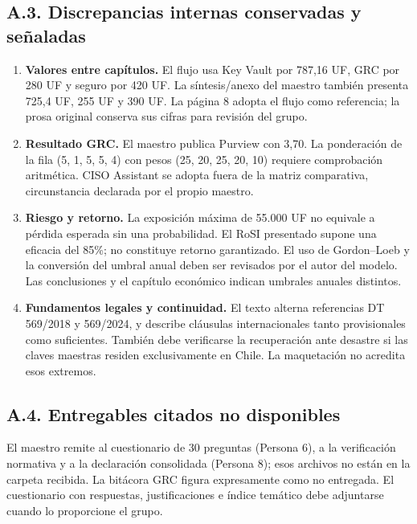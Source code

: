 \subsection{A.3. Discrepancias internas conservadas y señaladas}
\begin{enumerate}[itemsep=4pt]
\item \textbf{Valores entre capítulos.} El flujo usa Key Vault por 787,16 UF, GRC por 280 UF y seguro por 420 UF. La síntesis/anexo del maestro también presenta 725,4 UF, 255 UF y 390 UF. La página 8 adopta el flujo como referencia; la prosa original conserva sus cifras para revisión del grupo.
\item \textbf{Resultado GRC.} El maestro publica Purview con 3,70. La ponderación de la fila (5, 1, 5, 5, 4) con pesos (25, 20, 25, 20, 10) requiere comprobación aritmética. CISO Assistant se adopta fuera de la matriz comparativa, circunstancia declarada por el propio maestro.
\item \textbf{Riesgo y retorno.} La exposición máxima de 55.000 UF no equivale a pérdida esperada sin una probabilidad. El RoSI presentado supone una eficacia del 85\%; no constituye retorno garantizado. El uso de Gordon--Loeb y la conversión del umbral anual deben ser revisados por el autor del modelo. Las conclusiones y el capítulo económico indican umbrales anuales distintos.
\item \textbf{Fundamentos legales y continuidad.} El texto alterna referencias DT 569/2018 y 569/2024, y describe cláusulas internacionales tanto provisionales como suficientes. También debe verificarse la recuperación ante desastre si las claves maestras residen exclusivamente en Chile. La maquetación no acredita esos extremos.
\end{enumerate}

\subsection{A.4. Entregables citados no disponibles}
El maestro remite al cuestionario de 30 preguntas (Persona 6), a la verificación normativa y a la declaración consolidada (Persona 8); esos archivos no están en la carpeta recibida. La bitácora GRC figura expresamente como no entregada. El cuestionario con respuestas, justificaciones e índice temático debe adjuntarse cuando lo proporcione el grupo.
